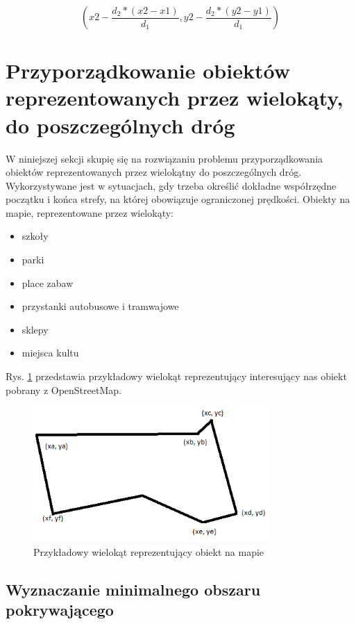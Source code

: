 \begin{equation} \label{eq:calculatedCoordinates}
(x2 - \frac{d_2*(x2 - x1)}{d_1}, y2 - \frac{d_2*(y2 - y1)}{d_1})
\end{equation}\newline

\newpage
\section{Przyporządkowanie obiektów reprezentowanych przez wielokąty, do poszczególnych dróg}
\label{sec:polygonLineDistance}

W niniejszej sekcji skupię się na rozwiązaniu problemu przyporządkowania obiektów reprezentowanych przez wielokątny do poszczególnych dróg. Wykorzystywane jest w sytuacjach, gdy trzeba określić dokładne współrzędne początku i końca strefy, na której obowiązuje ograniczonej prędkości. Obiekty na mapie, reprezentowane przez wielokąty:
\begin{itemize}
\item szkoły
\item parki
\item place zabaw
\item przystanki autobusowe i tramwajowe
\item sklepy
\item miejsca kultu
\end{itemize}

Rys. \ref{sec:firstBB} przedstawia przykładowy wielokąt reprezentujący interesujący nas obiekt pobrany z OpenStreetMap.  

\begin{figure}[h]
\label{sec:firstBB}
\caption{Przykładowy wielokąt reprezentujący obiekt na mapie}
\centering
\includegraphics[width=0.8\textwidth]{minBoundingBoxFirst}
\end{figure}

\newpage

\subsection{Wyznaczanie minimalnego obszaru pokrywającego}

